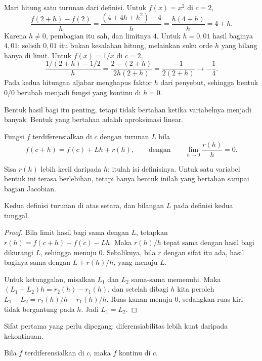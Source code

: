 Mari hitung satu turunan dari definisi. Untuk $f(x)=x^{2}$ di $c=2$,
\[
  \frac{f(2+h)-f(2)}{h}=\frac{(4+4h+h^{2})-4}{h}=\frac{h(4+h)}{h}=4+h .
\]
Karena $h\neq0$, pembagian itu sah, dan limitnya $4$. Untuk $h=0{,}01$ hasil baginya
$4{,}01$; selisih $0{,}01$ itu bukan kesalahan hitung, melainkan suku orde $h$ yang hilang
hanya di limit. Untuk $f(x)=1/x$ di $c=2$,
\[
  \frac{1/(2+h)-1/2}{h}
  =\frac{2-(2+h)}{2h(2+h)}=\frac{-1}{2(2+h)}\longrightarrow-\frac14 .
\]
Pada kedua hitungan aljabar menghapus faktor $h$ dari penyebut, sehingga bentuk $0/0$
berubah menjadi fungsi yang kontinu di $h=0$.

Bentuk hasil bagi itu penting, tetapi tidak bertahan ketika variabelnya menjadi banyak.
Bentuk yang bertahan adalah aproksimasi linear.

\begin{definisi}
Fungsi $f$ terdiferensialkan di $c$ dengan turunan $L$ bila
\[
  f(c+h)=f(c)+Lh+r(h),
  \qquad\text{dengan}\qquad
  \lim_{h\to0}\frac{r(h)}{h}=0 .
\]
\end{definisi}

Sisa $r(h)$ lebih kecil daripada $h$; itulah isi definisinya. Untuk satu variabel bentuk ini
terasa berlebihan, tetapi hanya bentuk inilah yang bertahan sampai bagian Jacobian.

\begin{proposisi}
Kedua definisi turunan di atas setara, dan bilangan $L$ pada definisi kedua tunggal.
\end{proposisi}

\begin{proof}
Bila limit hasil bagi sama dengan $L$, tetapkan $r(h)=f(c+h)-f(c)-Lh$. Maka $r(h)/h$ tepat
sama dengan hasil bagi dikurangi $L$, sehingga menuju $0$. Sebaliknya, bila $r$ dengan sifat
itu ada, hasil baginya sama dengan $L+r(h)/h$, yang menuju $L$.

Untuk ketunggalan, misalkan $L_{1}$ dan $L_{2}$ sama-sama memenuhi. Maka
$(L_{1}-L_{2})h=r_{2}(h)-r_{1}(h)$, dan setelah dibagi $h$ kita peroleh
$L_{1}-L_{2}=r_{2}(h)/h-r_{1}(h)/h$. Ruas kanan menuju $0$, sedangkan ruas kiri tidak
bergantung pada $h$. Jadi $L_{1}=L_{2}$.
\end{proof}

Sifat pertama yang perlu dipegang: diferensiabilitas lebih kuat daripada kekontinuan.

\begin{proposisi}
Bila $f$ terdiferensialkan di $c$, maka $f$ kontinu di $c$.
\end{proposisi}


